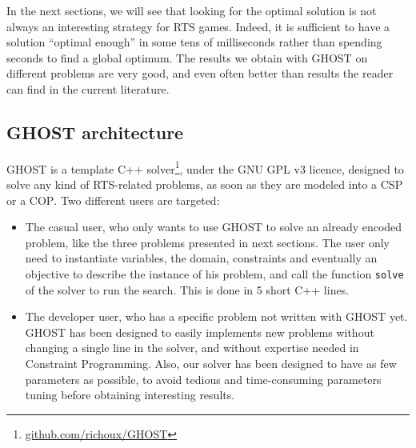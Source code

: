 \documentclass[journal]{IEEEtran}
\newcommand{\csp}{\textsc{CSP}\xspace}
\newcommand{\cop}{\textsc{COP}\xspace}
\newcommand{\ghost}{\textsc{GHOST}\xspace}
\begin{document}
In  the next  sections,  we  will see  that  looking  for the  optimal
solution is not always an  interesting strategy for RTS games. Indeed,
it is sufficient to have a solution ``optimal enough'' in some tens of
milliseconds   rather  than   spending  seconds   to  find   a  global
optimum. The results  we obtain with \ghost on  different problems are
very good, and  even often better than results the  reader can find in
the current literature.

\subsection{\ghost architecture}

\ghost             is            a             template            C++
solver\footnote{\href{https://github.com/richoux/GHOST}{github.com/richoux/GHOST}},
under  the  GNU  GPL  v3  licence,  designed  to  solve  any  kind  of
RTS-related problems,  as soon as  they are modeled  into a \csp  or a
\cop. Two different users are targeted:
\begin{itemize}
\item  The casual  user, who  only wants  to use  \ghost to  solve an
  already encoded problem,  like the three problems  presented in next
  sections.  The user only need  to instantiate variables, the domain,
  constraints and eventually an objective  to describe the instance of
  his problem, and  call the function \texttt{solve} of  the solver to
  run the  search. This is  done in 5 short  C++ lines.
\item The developer user, who has  a specific problem not written with
  \ghost  yet.  \ghost  has  been designed  to  easily implements  new
  problems without changing  a single line in the  solver, and without
  expertise needed  in Constraint  Programming.  Also, our  solver has
  been  designed to  have  as  few parameters  as  possible, to  avoid
  tedious  and  time-consuming   parameters  tuning  before  obtaining
  interesting results.
\end{itemize}
\end{document}
